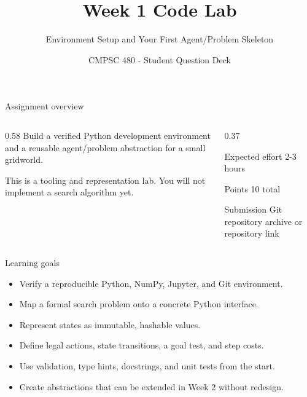 \documentclass[aspectratio=169,11pt]{beamer}
\title[CMPSC 480 - Week 1 Lab]{Week 1 Code Lab}
\subtitle{Environment Setup and Your First Agent/Problem Skeleton}
\author{CMPSC 480 - Student Question Deck}
\date{}
\begin{document}
\begin{frame}
  \titlepage
\end{frame}

\begin{frame}{Assignment overview}
  \begin{columns}[T,onlytextwidth]
    \begin{column}{0.58\textwidth}
      \Large
      Build a verified Python development environment and a reusable
      agent/problem abstraction for a small gridworld.

      \vspace{0.45cm}
      \normalsize
      This is a tooling and representation lab. You will not implement a
      search algorithm yet.
    \end{column}
    \begin{column}{0.37\textwidth}
      \begin{block}{Expected effort}
        2-3 hours
      \end{block}
      \begin{block}{Points}
        10 total
      \end{block}
      \begin{block}{Submission}
        Git repository archive or repository link
      \end{block}
    \end{column}
  \end{columns}
\end{frame}

\begin{frame}{Learning goals}
  \begin{itemize}
    \item Verify a reproducible Python, NumPy, Jupyter, and Git environment.
    \item Map a formal search problem onto a concrete Python interface.
    \item Represent states as immutable, hashable values.
    \item Define legal actions, state transitions, a goal test, and step costs.
    \item Use validation, type hints, docstrings, and unit tests from the start.
    \item Create abstractions that can be extended in Week 2 without redesign.
  \end{itemize}
\end{frame}
\end{document}
